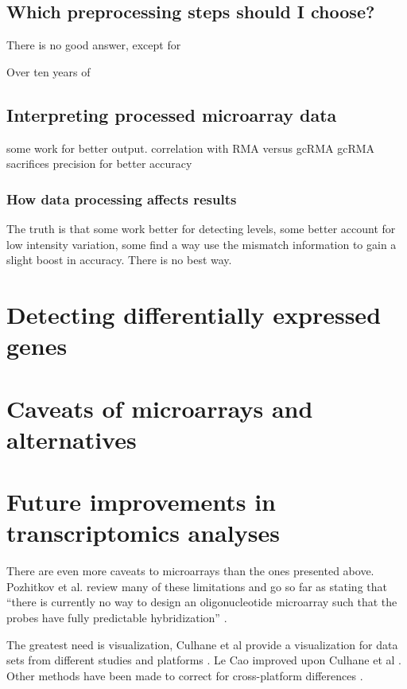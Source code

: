 \subsection{Which preprocessing steps should I choose?}
There is no good answer, except for


Over ten years of 

\subsection{Interpreting processed microarray data}

some work for better output. correlation with RMA versus gcRMA
gcRMA sacrifices precision for better accuracy

\subsubsection{How data processing affects results}

The truth is that some work better for detecting levels, some
better account for low intensity variation, some find a way use the mismatch
information to gain a slight boost in accuracy. There is no best way.



\section[Differential expression]{Detecting differentially expressed genes}


\section{Caveats of microarrays and alternatives}

\section{Future improvements in transcriptomics analyses}

There are even more caveats to microarrays than the ones presented
above. Pozhitkov et al. review many of these limitations and go
so far as stating that ``there is currently no way to design 
an oligonucleotide microarray such that the probes have 
fully predictable hybridization'' \cite{Pozhitkov:2007go}.


The greatest need is visualization, Culhane et al provide a visualization
for data sets from different studies and platforms \cite{Culhane:2003it}.
Le Cao improved upon Culhane et al \cite{Cao:2009dd}.
Other methods have been made to correct for cross-platform differences \cite{Fan:2011iy}.

